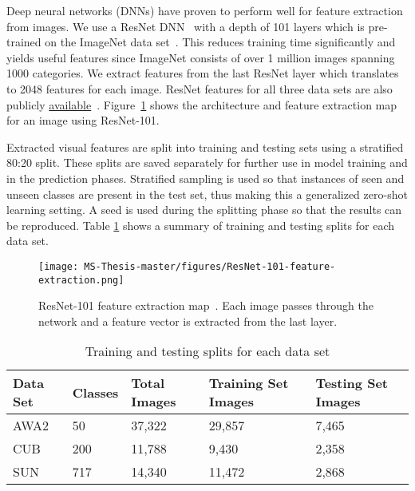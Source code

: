 \bigskip
\bigskip


Deep neural networks (DNNs) have proven to perform well for feature extraction from images. We use a ResNet DNN~\cite{resnet} with a depth of 101 layers which is pre-trained on the ImageNet  data set~\cite{imagenet}. This reduces training time significantly and yields useful features since ImageNet consists of over 1 million images spanning 1000 categories. We extract features from the last ResNet layer which translates to 2048 features for each image. ResNet features for all three data sets are also publicly \href{https://www.mpi-inf.mpg.de/departments/computer-vision-and-machine-learning/research/zero-shot-learning/zero-shot-learning-the-good-the-bad-and-the-ugly/}{available}~\cite{gbu}. Figure~\ref{image:resnet_features} shows the architecture and feature extraction map for an image using ResNet-101.

\par
\medskip

Extracted visual features are split into training and testing sets using a stratified 80:20 split. These splits are saved separately for further use in model training and in the prediction phases. Stratified sampling is used so that instances of seen and unseen classes are present in the test set, thus making this a generalized zero-shot learning setting. A seed is used during the splitting phase so that the results can be reproduced. Table \ref{table:train_test_splits} shows a summary of training and testing splits for each data set.

\medskip
\par

\begin{figure}[h!]
\texttt{[image: MS-Thesis-master/figures/ResNet-101-feature-extraction.png]}
\caption{ResNet-101 feature extraction map~\cite{resnet-101features}. Each image passes through the network and a feature vector is extracted from the last layer.}
\label{image:resnet_features}
\end{figure}

\par
\medskip

\begin{table}[h!]
\caption{Training and testing splits for each data set}
\centering
\begin{tabular}{@{}lllll@{}}
\toprule
\textbf{Data Set} & \textbf{Classes} & \textbf{Total Images} & \textbf{Training Set Images} & \textbf{Testing Set Images} \\ \midrule
AWA2             & 50               & 37,322          & 29,857                       & 7,465                       \\
CUB              & 200              & 11,788          & 9,430                        & 2,358                       \\
SUN              & 717              & 14,340          & 11,472                       & 2,868                       \\ \bottomrule
\end{tabular}
\label{table:train_test_splits}
\end{table}

